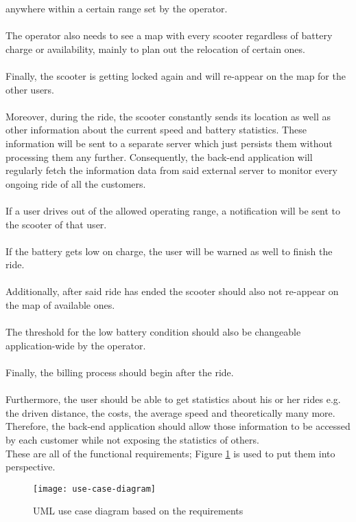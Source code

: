 \documentclass[12pt,a4paper,twoside]{report}
\begin{document}
anywhere within a certain range set by the operator.\\\\
The operator also needs to see a map with every scooter regardless of battery
charge or availability, mainly to plan out the relocation of certain ones.\\\\
Finally, the scooter is getting locked again and will re-appear on the map for the other users.\\\\
Moreover, during the ride, the scooter constantly sends its location as well
as other information about the current speed and battery statistics.
These information will be sent to a separate server which just persists them
without processing them any further.
Consequently, the back-end application will regularly fetch the information data
from said external server to monitor every ongoing ride of all the customers.\\\\
If a user drives out of the allowed operating range, a notification will be sent
to the scooter of that user.\\\\
If the battery gets low on charge, the user will be warned as well to finish the ride.\\\\
Additionally, after said ride has ended the scooter should also not re-appear
on the map of available ones.\\\\
The threshold for the low battery condition should also be changeable
application-wide by the operator.\\\\
Finally, the billing process should begin after the ride.\\\\
Furthermore, the user should be able to get statistics about his or her rides
e.g. the driven distance, the costs, the average speed and theoretically
many more. Therefore, the back-end application should allow those information
to be accessed by each customer while not exposing the statistics of others.\\

These are all of the functional requirements;
Figure \ref{fig:use-case-diagram} is used to put them into perspective.\\

\begin{figure}[htbp]
\centering
\texttt{[image: use-case-diagram]}
\caption{UML use case diagram based on the requirements}
\label{fig:use-case-diagram}
\end{figure}
\end{document}
